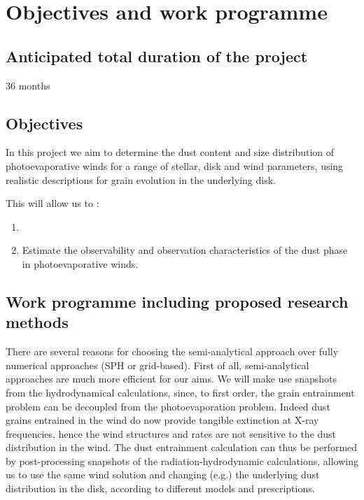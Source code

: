 \documentclass[10pt,fleqn,twoside]{article}
\begin{document}
\section{Objectives and work programme}
\renewcommand{\leftmark}{\sc Objectives and work programme}

\subsection{Anticipated total duration of the project}

36 months

\subsection{Objectives}
In this project
we aim to determine the dust content and size distribution of photoevaporative winds for a range of stellar, disk and wind parameters,
using realistic descriptions for grain evolution in the underlying
disk. 

This will allow us to : 
\begin{enumerate}
\item {}
\item Estimate the observability and observation characteristics of
the dust phase in photoevaporative winds.
\end{enumerate}

\subsection{Work programme including proposed research methods}


There are several reasons for choosing the semi-analytical approach
over fully numerical approaches (SPH or grid-based). First of all,
semi-analytical 
approaches are much more efficient for our aims. We will make
use snapshots from the hydrodynamical calculations, since, to first
order, the grain entrainment problem can be decoupled from the photoevaporation 
problem. Indeed 
dust grains entrained in the wind do now provide tangible extinction
at X-ray frequencies, hence the wind structures and rates are
not sensitive to the dust distribution in the wind. The dust
entrainment calculation can thus be performed by
post-processing snapshots of the radiation-hydrodynamic calculations,
allowing us
to use the same wind solution and changing (e.g.) the underlying dust
distribution in the disk, according to different models and
prescriptions. 
\end{document}
